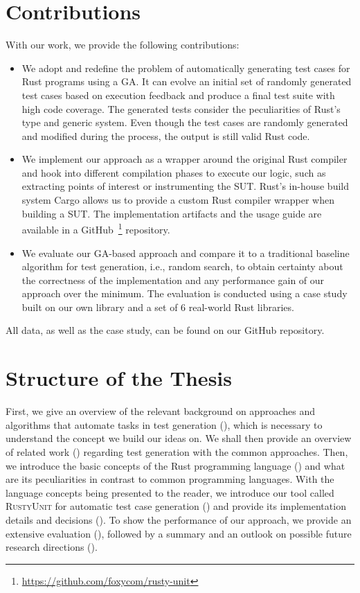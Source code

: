 \documentclass[paper=a4,%
  twoside,%
  BCOR4mm,%
  abstract=true,%
  toc=bibliography,%
  chapterprefix=true,%
  toc=bibliographynumbered,%
  open=right,%
  english,%
  pagesize=pdftex]{scrreprt}
\newcommand{\benchnum}{6\xspace}
\newcommand{\tech}{\textsc{RustyUnit}\xspace}
\newcommand{\sut}{\ac{SUT}\xspace}
\begin{document}
\section{Contributions}
With our work, we provide the following contributions:
\begin{itemize}
  \item We adopt and redefine the problem of automatically generating test cases for Rust programs using a \ac{GA}. It can evolve an initial set of randomly generated test cases based on execution feedback and produce a final test suite with high code coverage. The generated tests consider the peculiarities of Rust's type and generic system. Even though the test cases are randomly generated and modified during the process, the output is still valid Rust code.
  \item We implement our approach as a wrapper around the original Rust compiler and hook into different compilation phases to execute our logic, such as extracting points of interest or instrumenting the \sut. Rust's in-house build system Cargo allows us to provide a custom Rust compiler wrapper when building a \sut. The implementation artifacts and the usage guide are available in a GitHub~\footnote{\url{https://github.com/foxycom/rusty-unit}} repository.
  \item We evaluate our \ac{GA}-based approach and compare it to a traditional baseline algorithm for test generation, i.e., random search, to obtain certainty about the correctness of the implementation and any performance gain of our approach over the minimum. The evaluation is conducted using a case study built on our own library and a set of \benchnum real-world Rust libraries.
\end{itemize}
All data, as well as the case study, can be found on our GitHub repository.

\section{Structure of the Thesis}
First, we give an overview of the relevant background on approaches and algorithms that automate tasks in test generation (), which is necessary to understand the concept we build our ideas on. We shall then provide an overview of related work () regarding test generation with the common approaches. Then, we introduce the basic concepts of the Rust programming language () and what are its peculiarities in contrast to common programming languages. With the language concepts being presented to the reader, we introduce our tool called \tech for automatic test case generation () and provide its implementation details and decisions (). To show the performance of our approach, we provide an extensive evaluation (), followed by a summary and an outlook on possible future research directions ().
\end{document}
